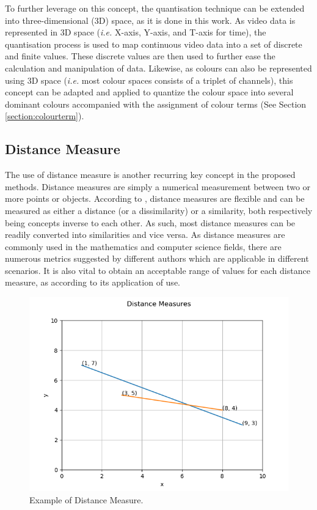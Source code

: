 To further leverage on this concept, the quantisation technique
can be extended into three-dimensional (3D) space, as it is done in this work. As video data is represented in 3D space (\emph{i.e.} X-axis, Y-axis, and T-axis for time), the quantisation process is used to map continuous video data into a set of discrete
and finite values. These discrete values are then used to further ease the
calculation and manipulation of data. Likewise, as colours can also be
represented using 3D space (\emph{i.e.} most colour spaces consists of a triplet of channels), this concept can be adapted and applied to quantize the colour space into several dominant colours accompanied
with the assignment of colour terms (See Section \ref{section:colourterm}).



\subsection{Distance Measure}
\label{section:distancemeasures}

The use of distance measure is another recurring key concept in the proposed
methods. Distance measures are simply a numerical measurement between
two or more points or objects. According to \cite{mccune2002distance},
distance measures are flexible and can be measured as either a distance (or a dissimilarity)
or a similarity, both respectively being concepts inverse to each other. As such, most distance measures can be readily converted into
similarities and vice versa. 
As distance measures are commonly used in the mathematics and
computer science fields, there are numerous metrics suggested by different
authors which are applicable in different scenarios. It is also
vital to obtain an acceptable range of values for each distance measure, as according to its application of use.

\begin{figure}[hbt!]
 \centering
 \includegraphics[width=.7\textwidth]{image/general/distance.png}
 \caption{Example of Distance Measure.}
 \label{fig:distanceMeasure}
\end{figure}

